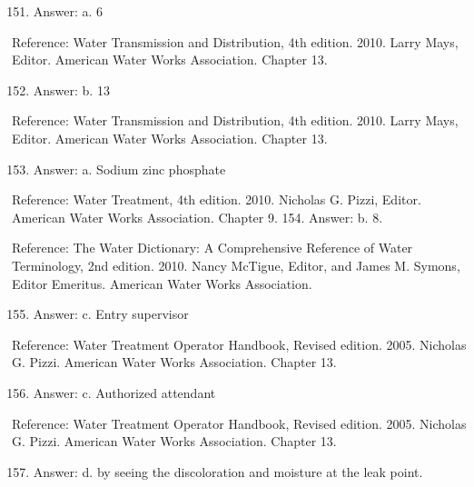 \documentclass[10pt]{article}
\begin{document}
\begin{enumerate}
  \setcounter{enumi}{150}
  \item Answer: a. 6
\end{enumerate}

Reference: Water Transmission and Distribution, 4th edition. 2010. Larry Mays, Editor. American Water Works Association. Chapter 13.

\begin{enumerate}
  \setcounter{enumi}{151}
  \item Answer: b. 13
\end{enumerate}

Reference: Water Transmission and Distribution, 4th edition. 2010. Larry Mays, Editor. American Water Works Association. Chapter 13.

\begin{enumerate}
  \setcounter{enumi}{152}
  \item Answer: a. Sodium zinc phosphate
\end{enumerate}

Reference: Water Treatment, 4th edition. 2010. Nicholas G. Pizzi, Editor. American Water Works Association. Chapter 9. 154. Answer: b. 8.

Reference: The Water Dictionary: A Comprehensive Reference of Water Terminology, 2nd edition. 2010. Nancy McTigue, Editor, and James M. Symons, Editor Emeritus. American Water Works Association.

\begin{enumerate}
  \setcounter{enumi}{154}
  \item Answer: c. Entry supervisor
\end{enumerate}

Reference: Water Treatment Operator Handbook, Revised edition. 2005. Nicholas G. Pizzi. American Water Works Association. Chapter 13.

\begin{enumerate}
  \setcounter{enumi}{155}
  \item Answer: c. Authorized attendant
\end{enumerate}

Reference: Water Treatment Operator Handbook, Revised edition. 2005. Nicholas G. Pizzi. American Water Works Association. Chapter 13.

\begin{enumerate}
  \setcounter{enumi}{156}
  \item Answer: d. by seeing the discoloration and moisture at the leak point.
\end{enumerate}
\end{document}
